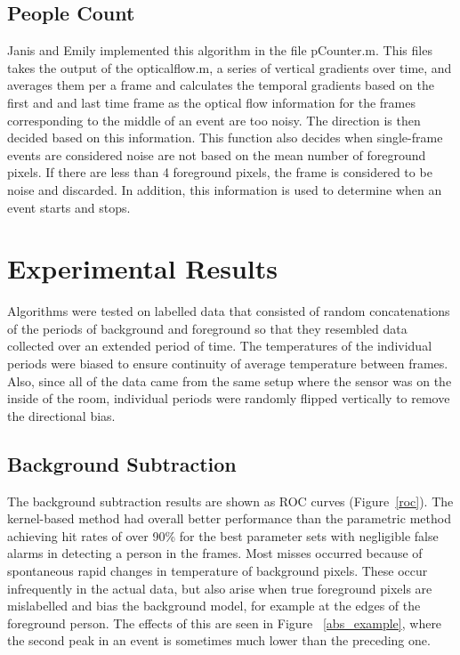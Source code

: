 \documentclass[12pt,oneside]{article} %
\begin{document}
\subsection{People Count}
Janis and Emily implemented this algorithm in the file pCounter.m. This files takes the output of the opticalflow.m, a series of vertical gradients over time, and averages them per a frame and calculates the temporal gradients based on the first and and last time frame as the optical flow information for the frames corresponding to the middle of an event are too noisy. The direction is then decided based on this information. This function also decides when single-frame events are considered noise are not based on the mean number of foreground pixels. If there are less than 4 foreground pixels, the frame is considered to be noise and discarded. In addition, this information is used to determine when an event starts and stops.

\section{Experimental Results}  %
Algorithms were tested on labelled data that consisted of random concatenations of the 
periods of background and foreground so that they resembled data collected
over an extended period of time. The temperatures of the individual periods were biased
to ensure continuity of average temperature between frames. 
Also, since all of the data came from the same
setup where the sensor was on the inside of the room, individual periods were randomly flipped
vertically to remove the directional bias.

\subsection{Background Subtraction}  %
The background subtraction results are shown as ROC curves (Figure~\ref{roc}).
The kernel-based method
had overall better performance than the parametric method achieving hit rates of over 90\% for the best
parameter sets with negligible false alarms in detecting a person in the frames. Most misses occurred
because of spontaneous rapid changes in temperature of background pixels. These occur infrequently
in the actual data, but also arise when true foreground pixels are mislabelled and bias the background model, for 
example at the edges of the foreground person. The effects of this are seen in Figure~ \ref{abs_example}, where
the second peak in an event is sometimes much lower than the preceding one.
\end{document}
